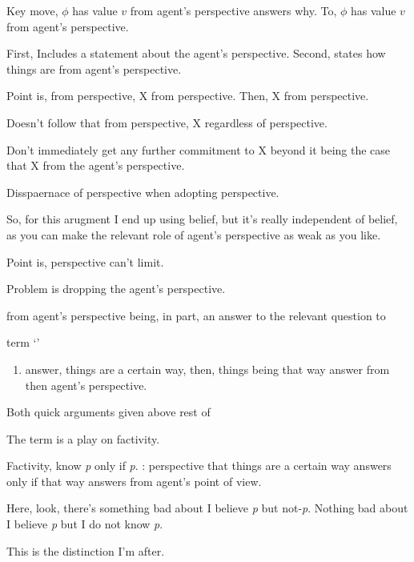 \begin{note}
  Key move, \(\phi\) has value \(v\) from agent's perspective answers why.
  To, \(\phi\) has value \(v\) from agent's perspective.

  First, Includes a statement about the agent's perspective.
  Second, states how things are from agent's perspective.

  Point is, from perspective, X from perspective.
  Then, X from perspective.

  Doesn't follow that from perspective, X regardless of perspective.

  Don't immediately get any further commitment to X beyond it being the case that X from the agent's perspective.

  Disspaernace of perspective when adopting perspective.

  So, for this arugment I end up using belief, but it's really independent of belief, as you can make the relevant role of agent's perspective as weak as you like.

  Point is, perspective can't limit.

  Problem is dropping the agent's perspective.
  

  from agent's perspective being, in part, an answer to the relevant question to 

  term `\emph{}'

  \begin{enumerate}
  \item[] \emph{}\newline
    answer, things are a certain way, then, things being that way answer from then agent's perspective.
  \end{enumerate}

  Both quick arguments given above rest of 

  The term is a play on factivity.

  Factivity, know \emph{p} only if \emph{p}.
  : perspective that things are a certain way answers only if that way answers from agent's point of view.
\end{note}

\begin{note}
  \citeauthor{Moore:1993wk}
  Here, look, there's something bad about I believe \emph{p} but not-\emph{p}.
  Nothing bad about I believe \emph{p} but I do not know \emph{p}.

  This is the distinction I'm after.
\end{note}

